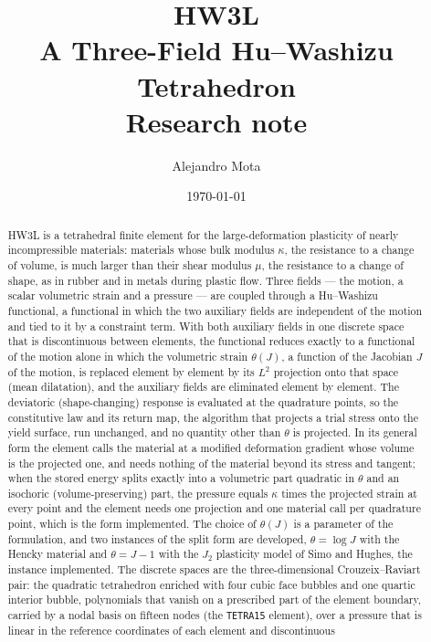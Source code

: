 \documentclass[11pt]{article}
\title{\textbf{HW3L}\\[0.3em]
  \large A Three-Field Hu--Washizu Tetrahedron\\[0.2em]
  \normalsize Research note}
\author{Alejandro Mota}
\date{\today}
\newcommand{\code}[1]{\texttt{#1}}
\theoremstyle{definition}
\theoremstyle{plain}
\begin{document}
\maketitle

\begin{abstract}
\noindent
HW3L is a tetrahedral finite
element for the large-deformation plasticity of nearly incompressible
materials: materials whose bulk modulus $\kappa$, the resistance to a change
of volume, is much larger than their shear modulus $\mu$, the resistance to a
change of shape, as in rubber and in metals during plastic flow. Three fields
--- the motion, a scalar volumetric strain and a pressure --- are coupled
through a Hu--Washizu functional, a functional in which the two auxiliary
fields are independent of the motion and tied to it by a constraint term.
With both auxiliary fields in one discrete space that is discontinuous
between elements, the functional reduces exactly to a functional of the
motion alone in which the volumetric strain $\theta(J)$, a function of the
Jacobian $J$ of the motion, is replaced element by element by its $L^2$
projection onto that space (mean dilatation), and the auxiliary fields are
eliminated element by element. The deviatoric (shape-changing) response is
evaluated at the quadrature points, so the constitutive law and its return
map, the algorithm that projects a trial stress onto the yield surface, run
unchanged, and no quantity other than $\theta$ is projected. In its general
form the element calls the material at a modified deformation gradient
whose volume is the projected one, and needs nothing of the material beyond
its stress and tangent; when the stored energy splits exactly into a
volumetric part quadratic in $\theta$ and an isochoric (volume-preserving)
part, the pressure equals $\kappa$ times the projected strain at every
point and the element needs one projection and one material call per
quadrature point, which is the form implemented. The choice of $\theta(J)$
is a parameter of the formulation, and two instances of the split form are
developed, $\theta = \log J$ with the Hencky material and $\theta = J - 1$
with the $J_2$ plasticity model of Simo and Hughes, the instance
implemented. The discrete spaces are the
three-dimensional Crouzeix--Raviart pair: the quadratic tetrahedron enriched
with four cubic face bubbles and one quartic interior bubble, polynomials
that vanish on a prescribed part of the element boundary, carried by a nodal
basis on fifteen nodes (the \code{TETRA15} element), over a pressure that is
linear in the reference coordinates of each element and discontinuous

\end{abstract}
\end{document}
